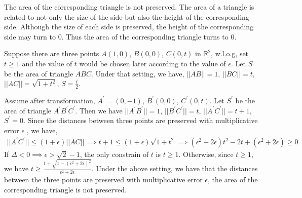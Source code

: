 
The area of the corresponding triangle is not preserved.
The area of a triangle is related to not only the size of the side but also the height of the corresponding side.
Although the size of each side is preserved, the height of the corresponding side may turn to $0$.
Thus the area of the corresponding triangle turns to $0$.

Suppose there are three points $A(1,0)$, $B(0,0)$, $C(0,t)$ in $\mathbb{R}^2$, 
w.l.o.g, set $t\ge 1$ and the value of $t$ would be chosen later according to the value of $\epsilon$.
Let $S$ be the area of triangle $ABC$.
Under that setting, we have, $||AB||=1$, $||BC||=t$, $||AC||=\sqrt{1+t^2}$, $S=\frac{t}{2}$.

Assume after transformation, $A^\prime=(0,-1)$, $B^\prime(0,0)$, $C^\prime(0,t)$.
Let $S^\prime$ be the area of triangle $A^\prime B^\prime C^\prime$.
Then we have $||A^\prime B^\prime ||=1$, $||B^\prime C^\prime ||=t$, $||A^\prime C^\prime ||=t+1$, $S^\prime=0$.
Since the distances between three points are preserved with multiplicative error $\epsilon$ , 
we have,
\begin{align}
    \nonumber ||A^\prime C^\prime||\le (1+\epsilon)||AC||\implies t+1 \le (1+\epsilon) \sqrt{1+t^2}\implies (\epsilon^2+2\epsilon)t^2-2t+(\epsilon^2+2\epsilon)\ge 0
\end{align}
If $\Delta<0\implies \epsilon > \sqrt{2}-1$, the only constrain of $t$ is $t\ge 1$.
Otherwise, 
since $t\ge1$, we have $t\ge \frac{1+\sqrt{1-(\epsilon^2+2\epsilon)^2}}{\epsilon^2+2\epsilon}$.
Under the above setting, we have that 
the distances between the three points are preserved with multiplicative error $\epsilon$,
the area of the corresponding triangle is not preserved.


